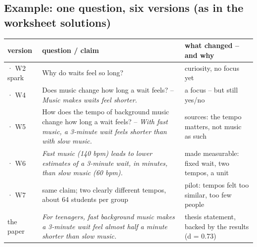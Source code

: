 \subsection{Example: one question, six versions \textcolor{muted}{(as in the worksheet solutions)}}
{\small\renewcommand{\arraystretch}{1.02}%
\begin{tabularx}{\linewidth}{@{}>{\raggedright\arraybackslash}p{19mm} >{\raggedright\arraybackslash}X >{\raggedright\arraybackslash}p{48mm}@{}}
\arrayrulecolor{rule}\toprule
\textbf{version} & \textbf{question / claim} & \textbf{what changed – and why}\\\midrule
0 · W2 spark & Why do waits feel so long? & curiosity, no focus yet\\
1 · W4 & Does music change how long a wait feels? – \emph{Music makes waits feel shorter.} & a focus – but still yes/no\\
2 · W5 & How does the tempo of background music change how long a wait feels? – \emph{With fast music, a 3-minute wait feels shorter than with slow music.} & sources: the tempo matters, not music as such\\
3 · W6 & \emph{Fast music (140 bpm) leads to lower estimates of a 3-minute wait, in minutes, than slow music (60 bpm).} & made measurable: fixed wait, two tempos, a unit\\
4 · W7 & same claim; two clearly different tempos, about 64 students per group & pilot: tempos felt too similar, too few people\\
the paper & \emph{For teenagers, fast background music makes a 3-minute wait feel almost half a minute shorter than slow music.} & thesis statement, backed by the results (d = 0.73)\\\bottomrule
\end{tabularx}}


